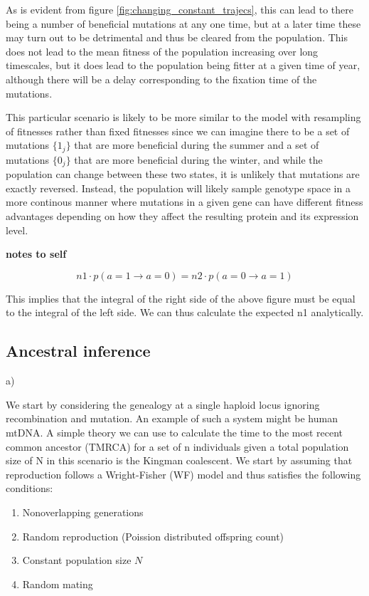 \documentclass{article}
\begin{document}
As is evident from figure \ref{fig:changing_constant_trajecs}, this can lead to there being a number of beneficial mutations at any one time, but at a later time these may turn out to be detrimental and thus be cleared from the population. This does not lead to the mean fitness of the population increasing over long timescales, but it does lead to the population being fitter at a given time of year, although there will be a delay corresponding to the fixation time of the mutations.

This particular scenario is likely to be more similar to the model with resampling of fitnesses rather than fixed fitnesses since we can imagine there to be a set of mutations $\{1_j\}$ that are more beneficial during the summer and a set of mutations $\{0_j\}$ that are more beneficial during the winter, and while the population can change between these two states, it is unlikely that mutations are exactly reversed. Instead, the population will likely sample genotype space in a more continous manner where mutations in a given gene can have different fitness advantages depending on how they affect the resulting protein and its expression level.


{\textbf{notes to self}}

\begin{equation}
n1 \cdot p(a=1 \rightarrow a=0) = n2 \cdot  p(a=0 \rightarrow a=1)
\end{equation}

This implies that the integral of the right side of the above figure must be equal to the integral of the left side. We can thus calculate the expected n1 analytically.

\newpage






\subsection{Ancestral inference}

a) %

We start by considering the genealogy at a single haploid locus ignoring recombination and mutation. An example of such a system might be human mtDNA.
A simple theory we can use to calculate the time to the most recent common ancestor (TMRCA) for a set of n individuals given a total population size of N in this scenario is the Kingman coalescent.
We start by assuming that reproduction follows a Wright-Fisher (WF) model and thus satisfies the following conditions:
\begin{enumerate}
\item Nonoverlapping generations
\item Random reproduction (Poission distributed offspring count)
\item Constant population size $N$
\item Random mating
\end{enumerate}
\end{document}
